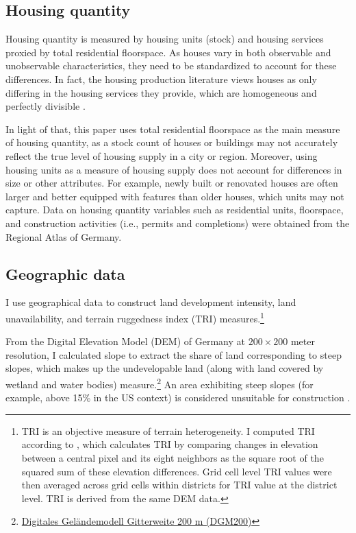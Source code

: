 \documentclass[
  12pt,
]{article}
\begin{document}
\subsection{Housing quantity}\label{housing-quantity}

Housing quantity is measured by housing units (stock) and housing
services proxied by total residential floorspace. As houses vary in both
observable and unobservable characteristics, they need to be
standardized to account for these differences. In fact, the housing
production literature views houses as only differing in the housing
services they provide, which are homogeneous and perfectly divisible
\citep{epple_etal_2010, combes_etal_2021}.

In light of that, this paper uses total residential floorspace as the
main measure of housing quantity, as a stock count of houses or
buildings may not accurately reflect the true level of housing supply in
a city or region. Moreover, using housing units as a measure of housing
supply does not account for differences in size or other attributes. For
example, newly built or renovated houses are often larger and better
equipped with features than older houses, which units may not capture.
Data on housing quantity variables such as residential units,
floorspace, and construction activities (i.e., permits and completions)
were obtained from the Regional Atlas of Germany.

\subsection{Geographic data}\label{geographic-data}

I use geographical data to construct land development intensity, land
unavailability, and terrain ruggedness index (TRI) measures.\footnote{TRI
  is an objective measure of terrain heterogeneity. I computed TRI
  according to \citet{riley_etal_1999}, which calculates TRI by
  comparing changes in elevation between a central pixel and its eight
  neighbors as the square root of the squared sum of these elevation
  differences. Grid cell level TRI values were then averaged across grid
  cells within districts for TRI value at the district level. TRI is
  derived from the same DEM data.}

From the Digital Elevation Model (DEM) of Germany at \(200\times200\)
meter resolution, I calculated slope to extract the share of land
corresponding to steep slopes, which makes up the undevelopable land
(along with land covered by wetland and water bodies)
measure.\footnote{\href{https://gdz.bkg.bund.de/index.php/default/digitale-geodaten/digitale-gelandemodelle/digitales-gelandemodell-gitterweite-200-m-dgm200.html}{Digitales
  Geländemodell Gitterweite 200 m (DGM200)}} An area exhibiting steep
slopes (for example, above 15\% in the US context) is considered
unsuitable for construction \citep{saiz_2010}.
\end{document}
